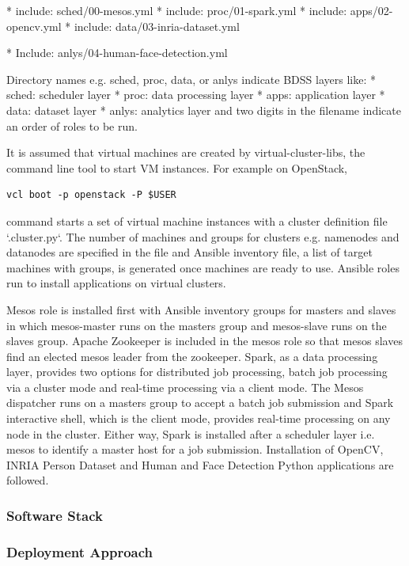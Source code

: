 \documentclass[9pt,twocolumn,twoside]{styles/osajnl}
\begin{document}
* include: sched/00-mesos.yml
* include: proc/01-spark.yml
* include: apps/02-opencv.yml
* include: data/03-inria-dataset.yml

* Include: anlys/04-human-face-detection.yml
	

Directory names e.g. sched, proc, data, or anlys indicate BDSS layers like:
* sched: scheduler layer
* proc: data processing layer
* apps: application layer
* data: dataset layer
* anlys: analytics layer
and two digits in the filename indicate an order of roles to be run. 


It is assumed that virtual machines are created by
virtual-cluster-libs, the command line tool to start VM instances. For
example on OpenStack, 

\begin{verbatim} 
vcl boot -p openstack -P $USER
\end{verbatim}

command starts a set of virtual machine instances with a cluster definition file `.cluster.py`. The number of machines and groups for clusters e.g. namenodes and datanodes are specified in the file and Ansible inventory file, a list of target machines with groups, is generated once machines are ready to use. Ansible roles run to install applications on virtual clusters.


Mesos role is installed first with Ansible inventory groups for masters and slaves in which mesos-master runs on the masters group and mesos-slave runs on the slaves group. Apache Zookeeper is included in the mesos role so that mesos slaves find an elected mesos leader from the zookeeper. Spark, as a data processing layer, provides two options for distributed job processing, batch job processing via a cluster mode and real-time processing via a client mode. The Mesos dispatcher runs on a masters group to accept a batch job submission and Spark interactive shell, which is the client mode, provides real-time processing on any node in the cluster. Either way, Spark is installed after a scheduler layer i.e. mesos to identify a master host for a job submission. Installation of OpenCV, INRIA Person Dataset and Human and Face Detection Python applications are followed.
\subsubsection{Software Stack}

\subsubsection{Deployment Approach}
\end{document}
